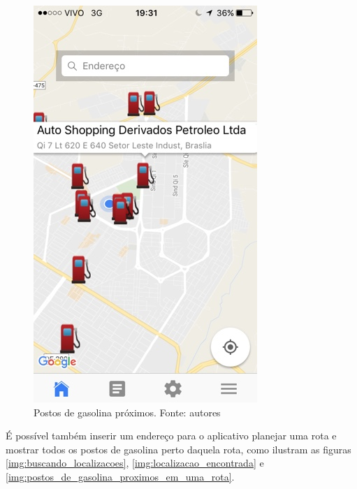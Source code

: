 \begin{figure}[H]
    \centering
    \includegraphics[scale=0.5]{figuras/app_2.jpg}
    \caption[Postos de gasolina próximos]{Postos de gasolina próximos. Fonte: autores}
    \label{img:postos_de_gasolina_proximos}
\end{figure}

É possível também inserir um endereço para o aplicativo planejar uma rota e mostrar todos os postos de gasolina perto daquela rota, como ilustram as figuras \ref{img:buscando_localizacoes}, \ref{img:localizacao_encontrada} e \ref{img:postos_de_gasolina_proximos_em_uma_rota}.

